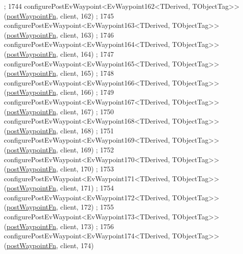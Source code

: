 \begin{DoxyCode}
      ;
1744     configurePostEvWaypoint<EvWaypoint162<TDerived, TObjectTag>>(\hyperlink{classmove__base__z__client_1_1WaypointEventDispatcher_acc538eb7506c13f7cca2268a1742dadd}{postWaypointFn}, client, 162)
      ;
1745     configurePostEvWaypoint<EvWaypoint163<TDerived, TObjectTag>>(\hyperlink{classmove__base__z__client_1_1WaypointEventDispatcher_acc538eb7506c13f7cca2268a1742dadd}{postWaypointFn}, client, 163)
      ;
1746     configurePostEvWaypoint<EvWaypoint164<TDerived, TObjectTag>>(\hyperlink{classmove__base__z__client_1_1WaypointEventDispatcher_acc538eb7506c13f7cca2268a1742dadd}{postWaypointFn}, client, 164)
      ;
1747     configurePostEvWaypoint<EvWaypoint165<TDerived, TObjectTag>>(\hyperlink{classmove__base__z__client_1_1WaypointEventDispatcher_acc538eb7506c13f7cca2268a1742dadd}{postWaypointFn}, client, 165)
      ;
1748     configurePostEvWaypoint<EvWaypoint166<TDerived, TObjectTag>>(\hyperlink{classmove__base__z__client_1_1WaypointEventDispatcher_acc538eb7506c13f7cca2268a1742dadd}{postWaypointFn}, client, 166)
      ;
1749     configurePostEvWaypoint<EvWaypoint167<TDerived, TObjectTag>>(\hyperlink{classmove__base__z__client_1_1WaypointEventDispatcher_acc538eb7506c13f7cca2268a1742dadd}{postWaypointFn}, client, 167)
      ;
1750     configurePostEvWaypoint<EvWaypoint168<TDerived, TObjectTag>>(\hyperlink{classmove__base__z__client_1_1WaypointEventDispatcher_acc538eb7506c13f7cca2268a1742dadd}{postWaypointFn}, client, 168)
      ;
1751     configurePostEvWaypoint<EvWaypoint169<TDerived, TObjectTag>>(\hyperlink{classmove__base__z__client_1_1WaypointEventDispatcher_acc538eb7506c13f7cca2268a1742dadd}{postWaypointFn}, client, 169)
      ;
1752     configurePostEvWaypoint<EvWaypoint170<TDerived, TObjectTag>>(\hyperlink{classmove__base__z__client_1_1WaypointEventDispatcher_acc538eb7506c13f7cca2268a1742dadd}{postWaypointFn}, client, 170)
      ;
1753     configurePostEvWaypoint<EvWaypoint171<TDerived, TObjectTag>>(\hyperlink{classmove__base__z__client_1_1WaypointEventDispatcher_acc538eb7506c13f7cca2268a1742dadd}{postWaypointFn}, client, 171)
      ;
1754     configurePostEvWaypoint<EvWaypoint172<TDerived, TObjectTag>>(\hyperlink{classmove__base__z__client_1_1WaypointEventDispatcher_acc538eb7506c13f7cca2268a1742dadd}{postWaypointFn}, client, 172)
      ;
1755     configurePostEvWaypoint<EvWaypoint173<TDerived, TObjectTag>>(\hyperlink{classmove__base__z__client_1_1WaypointEventDispatcher_acc538eb7506c13f7cca2268a1742dadd}{postWaypointFn}, client, 173)
      ;
1756     configurePostEvWaypoint<EvWaypoint174<TDerived, TObjectTag>>(\hyperlink{classmove__base__z__client_1_1WaypointEventDispatcher_acc538eb7506c13f7cca2268a1742dadd}{postWaypointFn}, client, 174)

\end{DoxyCode}
